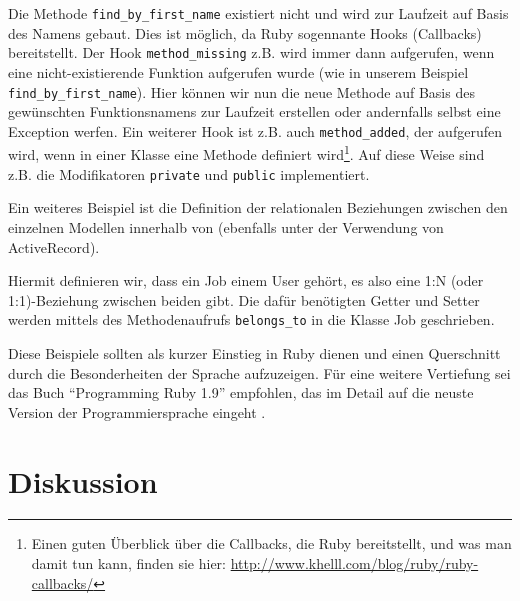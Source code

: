 Die Methode \texttt{find\_by\_first\_name} existiert nicht und wird zur Laufzeit auf Basis des Namens gebaut. Dies ist möglich, da Ruby sogennante Hooks (Callbacks) bereitstellt. Der Hook \texttt{method\_missing} z.B. wird immer dann aufgerufen, wenn eine nicht-existierende Funktion aufgerufen wurde (wie in unserem Beispiel \texttt{find\_by\_first\_name}). Hier können wir nun die neue Methode auf Basis des gewünschten Funktionsnamens zur Laufzeit erstellen oder andernfalls selbst eine Exception werfen. Ein weiterer Hook ist z.B. auch \texttt{method\_added}, der aufgerufen wird, wenn in einer Klasse eine Methode definiert wird\footnote{Einen guten Überblick über die Callbacks, die Ruby bereitstellt, und was man damit tun kann, finden sie hier: \url{http://www.khelll.com/blog/ruby/ruby-callbacks/}}. Auf diese Weise sind z.B. die Modifikatoren \texttt{private} und \texttt{public} implementiert.

Ein weiteres Beispiel ist die Definition der relationalen Beziehungen zwischen den einzelnen Modellen innerhalb von  (ebenfalls unter der Verwendung von ActiveRecord).
\begin{ruby}[label=app/models/job.rb]
   
   
\end{ruby}

Hiermit definieren wir, dass ein Job einem User gehört, es also eine 1:N (oder 1:1)-Beziehung zwischen beiden gibt. Die dafür benötigten Getter und Setter werden mittels des Methodenaufrufs \texttt{belongs\_to} in die Klasse Job geschrieben.

Diese Beispiele sollten als kurzer Einstieg in Ruby dienen und einen Querschnitt durch die Besonderheiten der Sprache aufzuzeigen.
Für eine weitere Vertiefung sei das Buch "`Programming Ruby 1.9"' empfohlen, das im Detail auf die neuste Version der Programmiersprache eingeht \citep{hunt_programming_2009}.



\section{Diskussion}


